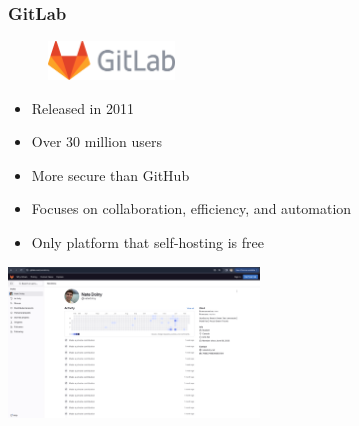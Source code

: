 \documentclass{beamer}
\begin{document}
\begin{frame}
	\frametitle{\textbf{GitLab}}
		
	\begin{multicols}{2}
		\begin{figure}[h]
			\centering
			\includegraphics[width=0.3\textwidth]{img/GitLab_logo.png} 
		\end{figure}

		\begin{itemize}
			\item Released in 2011
			\item Over 30 million users
			\item More secure than GitHub
			\item Focuses on collaboration, efficiency, and automation 
			\item Only platform that self-hosting is free 
		\end{itemize}

		\includegraphics[width=0.5\textwidth]{img/gitlab_ui.png} 
	\end{multicols}
\end{frame}
\end{document}
